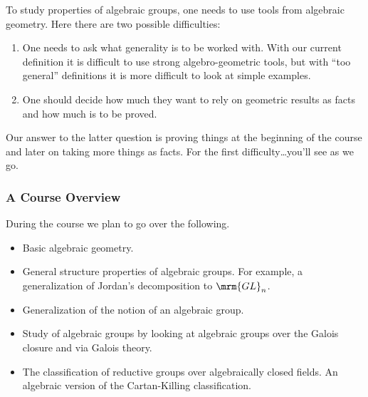 \documentclass[10pt,a4paper,twoside,openany,hidelinks]{book}
\begin{document}
To study properties of algebraic groups, one needs to use tools from algebraic geometry. Here there are two possible difficulties:

\begin{enumerate}
\item One needs to ask what generality is to be worked with. With our current definition it is difficult to use strong algebro-geometric tools, but with ``too general'' definitions it is more difficult to look at simple examples.

\item One should decide how much they want to rely on geometric results as facts and how much is to be proved.
\end{enumerate}

Our answer to the latter question is proving things at the beginning of the course and later on taking more things as facts. For the first difficulty\ldots you'll see as we go.

\subsubsection{A Course Overview}

During the course we plan to go over the following.

\begin{itemize}
\item Basic algebraic geometry.

\item General structure properties of algebraic groups. For example, a generalization of Jordan's decomposition to $\mrm{GL}_n$.

\item Generalization of the notion of an algebraic group.

\item Study of algebraic groups by looking at algebraic groups over the Galois closure and via Galois theory.

\item The classification of reductive groups over algebraically closed fields. An algebraic version of the Cartan-Killing classification.
\end{itemize}

\backmatter
\end{document}
